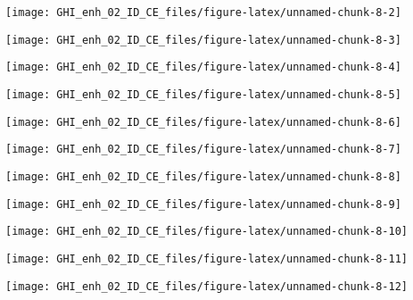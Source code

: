 \documentclass[
  10pt,
  a4paper,oneside]{article}
\begin{document}
\begin{center}\texttt{[image: GHI\_enh\_02\_ID\_CE\_files/figure-latex/unnamed-chunk-8-2]} \end{center}

\begin{center}\texttt{[image: GHI\_enh\_02\_ID\_CE\_files/figure-latex/unnamed-chunk-8-3]} \end{center}

\begin{center}\texttt{[image: GHI\_enh\_02\_ID\_CE\_files/figure-latex/unnamed-chunk-8-4]} \end{center}

\begin{center}\texttt{[image: GHI\_enh\_02\_ID\_CE\_files/figure-latex/unnamed-chunk-8-5]} \end{center}

\begin{center}\texttt{[image: GHI\_enh\_02\_ID\_CE\_files/figure-latex/unnamed-chunk-8-6]} \end{center}

\begin{center}\texttt{[image: GHI\_enh\_02\_ID\_CE\_files/figure-latex/unnamed-chunk-8-7]} \end{center}

\begin{center}\texttt{[image: GHI\_enh\_02\_ID\_CE\_files/figure-latex/unnamed-chunk-8-8]} \end{center}

\begin{center}\texttt{[image: GHI\_enh\_02\_ID\_CE\_files/figure-latex/unnamed-chunk-8-9]} \end{center}

\begin{center}\texttt{[image: GHI\_enh\_02\_ID\_CE\_files/figure-latex/unnamed-chunk-8-10]} \end{center}

\begin{center}\texttt{[image: GHI\_enh\_02\_ID\_CE\_files/figure-latex/unnamed-chunk-8-11]} \end{center}

\begin{center}\texttt{[image: GHI\_enh\_02\_ID\_CE\_files/figure-latex/unnamed-chunk-8-12]} \end{center}
\end{document}
